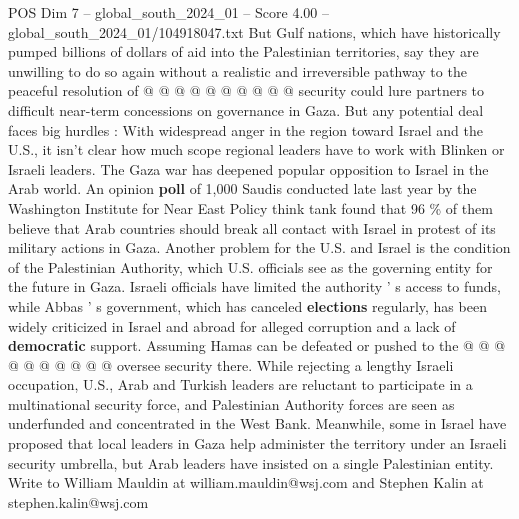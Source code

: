 \begin{textsample}{POS Dim 7 – global\_south\_2024\_01 – Score 4.00 – global\_south\_2024\_01/104918047.txt}
But Gulf nations, which have historically pumped billions of dollars of aid into the Palestinian territories, say they are unwilling to do so again without a realistic and irreversible pathway to the peaceful resolution of @ @ @ @ @ @ @ @ @ @ security could lure partners to difficult near-term concessions on governance in Gaza.
But any potential deal faces big hurdles : With widespread anger in the region toward Israel and the U.S., it isn't clear how much scope regional leaders have to work with Blinken or Israeli leaders.
The Gaza war has deepened popular opposition to Israel in the Arab world.
An opinion \textbf{poll} of 1,000 Saudis conducted late last year by the Washington Institute for Near East Policy think tank found that 96 \% of them believe that Arab countries should break all contact with Israel in protest of its military actions in Gaza.
Another problem for the U.S. and Israel is the condition of the Palestinian Authority, which U.S. officials see as the governing entity for the future in Gaza.
Israeli officials have limited the authority ' s access to funds, while Abbas ' s government, which has canceled \textbf{elections} regularly, has been widely criticized in Israel and abroad for alleged corruption and a lack of \textbf{democratic} support.
Assuming Hamas can be defeated or pushed to the @ @ @ @ @ @ @ @ @ @ oversee security there.
While rejecting a lengthy Israeli occupation, U.S., Arab and Turkish leaders are reluctant to participate in a multinational security force, and Palestinian Authority forces are seen as underfunded and concentrated in the West Bank.
Meanwhile, some in Israel have proposed that local leaders in Gaza help administer the territory under an Israeli security umbrella, but Arab leaders have insisted on a single Palestinian entity.
Write to William Mauldin at william.mauldin@wsj.com and Stephen Kalin at stephen.kalin@wsj.com

\end{textsample}
